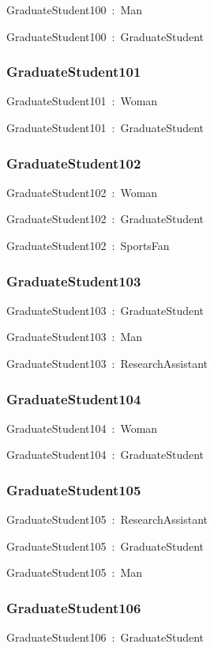 \documentclass{article}
\begin{document}
GraduateStudent100~:~Man

GraduateStudent100~:~GraduateStudent

\subsubsection*{GraduateStudent101}

GraduateStudent101~:~Woman

GraduateStudent101~:~GraduateStudent

\subsubsection*{GraduateStudent102}

GraduateStudent102~:~Woman

GraduateStudent102~:~GraduateStudent

GraduateStudent102~:~SportsFan

\subsubsection*{GraduateStudent103}

GraduateStudent103~:~GraduateStudent

GraduateStudent103~:~Man

GraduateStudent103~:~ResearchAssistant

\subsubsection*{GraduateStudent104}

GraduateStudent104~:~Woman

GraduateStudent104~:~GraduateStudent

\subsubsection*{GraduateStudent105}

GraduateStudent105~:~ResearchAssistant

GraduateStudent105~:~GraduateStudent

GraduateStudent105~:~Man

\subsubsection*{GraduateStudent106}

GraduateStudent106~:~GraduateStudent
\end{document}

